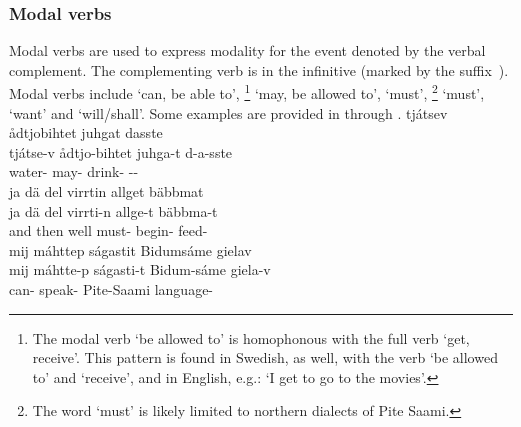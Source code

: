 \subsubsection{Modal verbs}\label{modalVs}
Modal verbs are used to express modality for the event denoted by the verbal complement. The complementing verb is in the infinitive (marked by the \mbox{suffix ).} Modal verbs include  ‘can, be able to’, 
\footnote{The modal verb  ‘be allowed to’ is homophonous with the full verb  ‘get, receive’. This pattern is found in Swedish, as well, with the verb  ‘be allowed to’ and ‘receive’, and in English, e.g.: ‘I get to go to the movies’.} 
‘may, be allowed to’, 
 ‘must’, \footnote{The word  ‘must’ is likely limited to northern dialects of Pite Saami.} 
‘must’,  ‘want’ and  ‘will/shall’. 
Some examples are provided in  through . %
\ea\label{modalVerbs1}%
\glll	tjátsev ådtjobihtet juhgat dasste\\
	tjátse-v ådtjo-bihtet juhga-t d-a-sste\\
	water- may- drink- --\\\nopagebreak
{} 
\z
\ea\label{modalVerbs2a}%
\glll	ja dä del virrtin allget bäbbmat\\
	ja dä del virrti-n allge-t bäbbma-t\\
	and then well must- begin- feed-\\\nopagebreak
{} 
\z
\ea\label{modalVerbs3}%
\glll	mij máhttep ságastit Bidumsáme gielav\\
	mij máhtte-p ságasti-t Bidum-sáme giela-v\\
	 can- speak- Pite-Saami\BS{} language-\\\nopagebreak
{} 
\z

